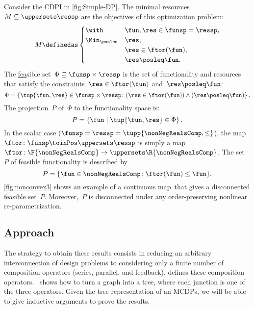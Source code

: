 \begin{example}
    \label{exa:one}
    Consider the CDPI in \cref{fig:Simple-DP}.
    The \uline{m}inimal resources~$M\subseteq\uppersets \ressp$ are the objectives of this optimization problem:
    \begin{equation*}
        M\definedas\begin{cases}
                       \with & \fun,\res\in\funsp=\ressp,\\
                       \Min_{\posleq} & \res,\\
                       & \res\in\ftor(\fun),\\
                       & \res\posleq\fun.
        \end{cases}
    \end{equation*}
    The \uline{fea}sible set~$\Phi\subseteq\funsp\times\ressp$ is the set of functionality and resources that satisfy the constraints~$\res\in\ftor(\fun)$ and~$\res\posleq\fun$:
    \begin{equation}
        \Phi=\left\{ \tup{\fun,\res}\in\funsp\times\ressp\colon (\res\in\ftor(\fun))\wedge(\res\posleq\fun)\right\} .\label{eq:feasible}
    \end{equation}
    The \uline{p}rojection~$P$ of~$\Phi$ to the functionality space is:
    \begin{equation*}
        P=\left\{ \fun\mid\tup{\fun,\res} \in\Phi\right\}.
    \end{equation*}
    In the scalar case ($\funsp=\ressp=\tupp{\nonNegRealsComp,\leq}$), the map~$\ftor\colon\funsp\toinPos\uppersets \ressp$ is simply a map~$\ftor\colon\F{\nonNegRealsComp}\to \uppersets\R{\nonNegRealsComp}$.
    The set~$P$ of feasible functionality is described by
    \begin{equation}
        P=\{\fun\in\nonNegRealsComp\colon \ftor(\fun)\leq\fun\}.\label{eq:Pfeasible}
    \end{equation}
    \cref{fig:nonconvex3} shows an example of a continuous map~\ftor that gives a disconnected feasible set~$P$.
    Moreover,~$P$ is disconnected under any order-preserving nonlinear re-parametrization.

\end{example}

\subsection{Approach}

The strategy to obtain these results  consists in reducing an arbitrary interconnection of design problems to considering only a finite number of composition operators (series, parallel, and feedback).
 defines these composition operators.
~shows how to turn a graph into a tree, where each junction is one of the three operators.
Given the tree representation of an MCDPs, we will be able to give inductive arguments to prove the results.

